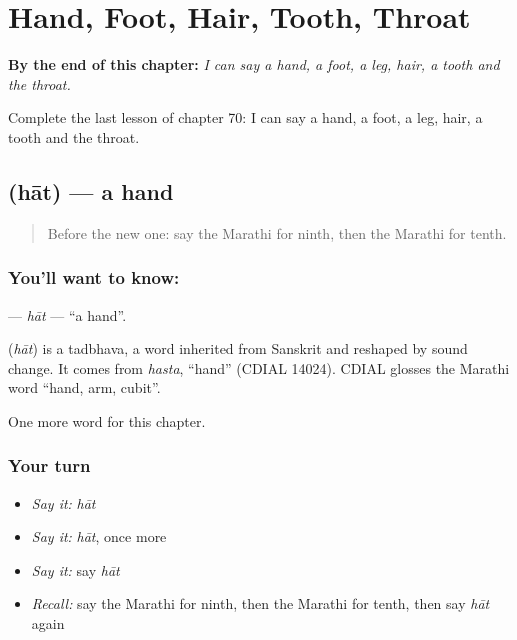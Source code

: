 
\chapter{Hand, Foot, Hair, Tooth, Throat}
\label{ch:mr-hand-foot-hair-tooth-throat}

\begin{chapteropening}
\textbf{By the end of this chapter:} \emph{I can say a hand, a foot, a leg, hair, a tooth and the throat.}

Complete the last lesson of chapter 70: I can say a hand, a foot, a leg, hair, a tooth and the throat.
\end{chapteropening}

\section[\texorpdfstring{\mr{हात} (hāt)}{हात (hāt)}]{ (hāt) — a hand}

\label{lesson:MR-C70-hat}



\begin{quote}
Before the new one: say the Marathi for ninth, then the Marathi for tenth.
\end{quote}

\subsection*{You'll want to know: }
\textbf{} — \emph{hāt} — \textquotedblleft{}a hand\textquotedblright{}.

\begin{cousinweb}
\textbf{} (\emph{hāt}) is a tadbhava, a word inherited from Sanskrit and reshaped by sound change. It comes from \emph{hasta}, \textquotedblleft{}hand\textquotedblright{} (CDIAL 14024). CDIAL glosses the Marathi word \textquotedblleft{}hand, arm, cubit\textquotedblright{}.
\end{cousinweb}

\begin{grammarlens}[title={What you've built}]
One more word for this chapter.
\end{grammarlens}

\subsection*{Your turn}
\begin{itemize}
\raggedright
  \item \emph{Say it:} \emph{hāt}
  \item \emph{Say it:} \emph{hāt}, once more
  \item \emph{Say it:} say \emph{hāt}
  \item \emph{Recall:} say the Marathi for ninth, then the Marathi for tenth, then say \emph{hāt} again
\end{itemize}

